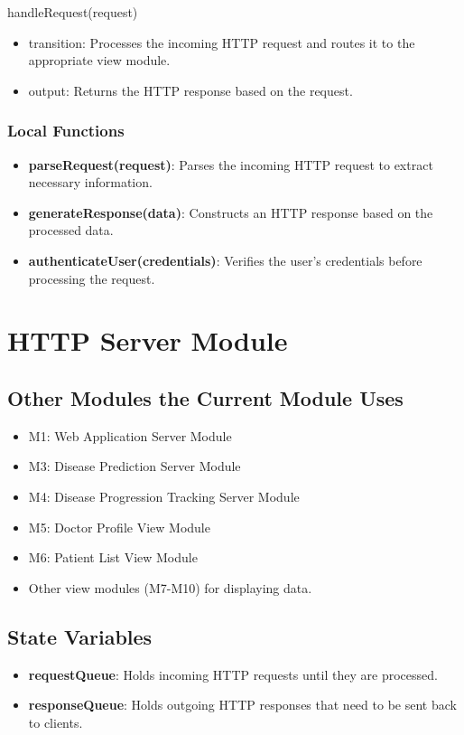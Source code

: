 \documentclass[12pt, titlepage]{article}
\begin{document}
handleRequest(request)
\begin{itemize}
\item transition:  Processes the incoming HTTP request and routes it to the appropriate view module.
\item output: Returns the HTTP response based on the request.
\end{itemize}
\subsubsection{Local Functions}
\begin{itemize}
  \item \textbf{parseRequest(request)}: Parses the incoming HTTP request to extract necessary information.
  \item \textbf{generateResponse(data)}: Constructs an HTTP response based on the processed data.
  \item \textbf{authenticateUser(credentials)}: Verifies the user's credentials before processing the request.
\end{itemize}
\newpage

\newpage
\section{HTTP Server Module}

\subsection{Other Modules the Current Module Uses}
\begin{itemize}
    \item M1: Web Application Server Module
    \item M3: Disease Prediction Server Module
    \item M4: Disease Progression Tracking Server Module
    \item M5: Doctor Profile View Module
    \item M6: Patient List View Module
    \item Other view modules (M7-M10) for displaying data.
\end{itemize}

\subsection{State Variables}
\begin{itemize}
    \item \textbf{requestQueue}: Holds incoming HTTP requests until they are processed.
    \item \textbf{responseQueue}: Holds outgoing HTTP responses that need to be sent back to clients.
\end{itemize}
\end{document}
